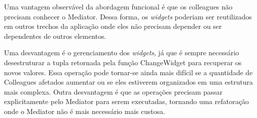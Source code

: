 Uma vantagem observável da abordagem funcional é 
que os colleagues não precisam conhecer o Mediator. 
Dessa forma, os \textit{widgets} poderiam ser 
reutilizados em outros trechos da aplicação onde 
eles não precisam depender ou ser dependentes 
de outros elementos. 

Uma desvantagem é o gerenciamento dos \textit{widgets}, 
já que é sempre necessário desestruturar a tupla retornada 
pela função ChangeWidget para recuperar os novos 
valores. Essa operação pode tornar-se ainda mais 
difícil se a quantidade de Colleagues afetados 
aumentar ou se eles estiverem organizados em uma estrutura 
mais complexa. Outra desvantagem é que as operações 
precisam passar explicitamente pelo Mediator para 
serem executadas, tornando uma refatoração 
onde o Mediator não é mais necessário mais custosa.